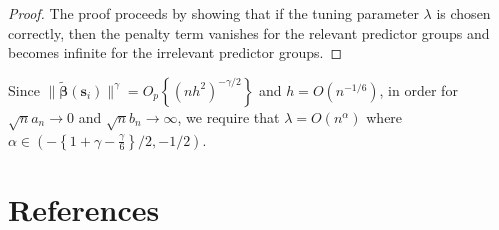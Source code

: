 \documentclass[authoryear, review, 11pt]{elsarticle}
\begin{document}
    \begin{proof}
      The proof proceeds by showing that if the tuning parameter $\lambda$ is chosen correctly, then the penalty term vanishes for the relevant predictor groups and becomes infinite for the irrelevant predictor groups.

    \end{proof}

    Since $ \| \tilde{\bm{\beta}} (\bm{s}_i) \|^{\gamma} = O_p\left\{ ( n h^2 )^{-\gamma / 2} \right\} $ and $h = O(n^{-1/6})$, in order for $\sqrt{n} a_n \to 0$ and $\sqrt{n} b_n \to \infty$, we require that $\lambda = O(n^{\alpha})$ where $\alpha \in \left( - \left\{ 1 + \gamma - \frac{\gamma}{6} \right\} /2, -1/2 \right) $.

\section{References}


\end{document}

